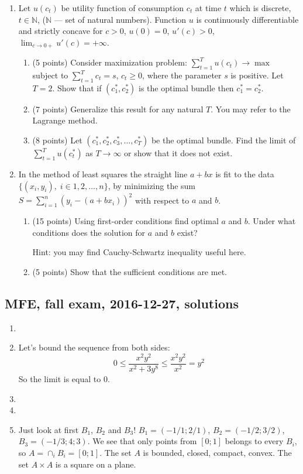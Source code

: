 \documentclass[12pt]{article} %
\theoremstyle{definition} %
\begin{document}
\begin{enumerate}[resume]


\item Let $u(c_t)$ be utility function of consumption $c_t$ at time $t$ which is discrete, $t \in \mathbb{N}$, ($\mathbb{N}$ --- set of natural numbers).
Function $u$ is continuously differentiable and strictly concave for $c>0$, $u(0)=0$, $u'(c)>0$, $\lim_{c\to 0+ } u'(c) = +\infty$.
\begin{enumerate}
\item (5 points) Consider maximization problem: $\sum_{t=1}^T u(c_t) \to \max$ subject to $\sum_{t=1}^T c_t = s$, $c_t\geq 0$, where the parameter $s$ is positive.
Let $T=2$. Show that if $(c_1^*, c_2^*)$ is the optimal bundle then $c_1^* = c_2^*$.
\item (7 points) Generalize this result for any natural $T$. You may refer to the Lagrange method.
\item (8 points) Let $(c_1^*, c_2^*, c_3^*, \ldots, c_T^*)$  be the optimal bundle. Find the limit of $\sum_{t=1}^T u(c^*_t)$  as $T \to \infty$ or show that it does not exist.
\end{enumerate}

\item In the method of least squares the straight line $a + bx$ is fit to the data $\{ (x_i, y_i), \; i \in 1, 2, \ldots, n \}$,
by minimizing the sum $S = \sum_{i=1}^n (y_i - (a + b x_i))^2$ with respect to $a$ and $b$.
\begin{enumerate}
\item (15 points) Using first-order conditions find optimal $a$ and $b$. Under what conditions does the solution for $a$ and $b$ exist?

Hint: you may find Cauchy-Schwartz inequality useful here.
\item (5 points) Show that the sufficient conditions are met.
\end{enumerate}

\end{enumerate}


\subsection{MFE, fall exam, 2016-12-27, solutions}

\begin{enumerate}
  \item 
  \item Let's bound the sequence from both sides:
  \[
    0 \leq \frac{x^2 y^2}{x^2 + 3y^8} \leq \frac{x^2 y^2}{x^2} = y^2
  \]
  So the limit is equal to $0$.
  \item 
  \item 
  \item Just look at first $B_1$, $B_2$ and $B_3$! $B_1 = (-1/1 ; 2/1)$, $B_2 = (-1/2; 3/2)$, $B_3 = (-1/3; 4;3)$.
  We see that only points from $[0;1]$ belongs to every $B_i$, so $A = \cap_i B_i = [0;1]$.
  The set $A$ is bounded, closed, compact, convex. The set $A \times A$ is a square on a plane. 
\end{enumerate}
\end{document}

